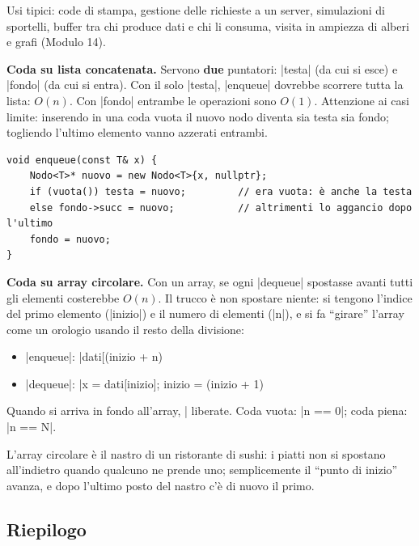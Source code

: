 Usi tipici: code di stampa, gestione delle richieste a un server, simulazioni di
sportelli, buffer tra chi produce dati e chi li consuma, visita in ampiezza di alberi e
grafi (Modulo 14).

\textbf{Coda su lista concatenata.} Servono \textbf{due} puntatori: \cc|testa| (da cui
si esce) e \cc|fondo| (da cui si entra). Con il solo \cc|testa|, \cc|enqueue| dovrebbe
scorrere tutta la lista: $O(n)$. Con \cc|fondo| entrambe le operazioni sono $O(1)$.
Attenzione ai casi limite: inserendo in una coda vuota il nuovo nodo diventa sia testa
sia fondo; togliendo l'ultimo elemento vanno azzerati entrambi.
\begin{lstlisting}
void enqueue(const T& x) {
    Nodo<T>* nuovo = new Nodo<T>{x, nullptr};
    if (vuota()) testa = nuovo;         // era vuota: è anche la testa
    else fondo->succ = nuovo;           // altrimenti lo aggancio dopo l'ultimo
    fondo = nuovo;
}
\end{lstlisting}

\textbf{Coda su array circolare.} Con un array, se ogni \cc|dequeue| spostasse avanti
tutti gli elementi costerebbe $O(n)$. Il trucco è non spostare niente: si tengono
l'indice del primo elemento (\cc|inizio|) e il numero di elementi (\cc|n|), e si fa
``girare'' l'array come un orologio usando il resto della divisione:
\begin{itemize}
  \item \cc|enqueue|: \cc|dati[(inizio + n) %
  \item \cc|dequeue|: \cc|x = dati[inizio]; inizio = (inizio + 1) %
\end{itemize}
Quando si arriva in fondo all'array, \cc|%
liberate. Coda vuota: \cc|n == 0|; coda piena: \cc|n == N|.

\begin{analogia}
L'array circolare è il nastro di un ristorante di sushi: i piatti non si spostano
all'indietro quando qualcuno ne prende uno; semplicemente il ``punto di inizio'' avanza,
e dopo l'ultimo posto del nastro c'è di nuovo il primo.
\end{analogia}

\subsection*{Riepilogo}


